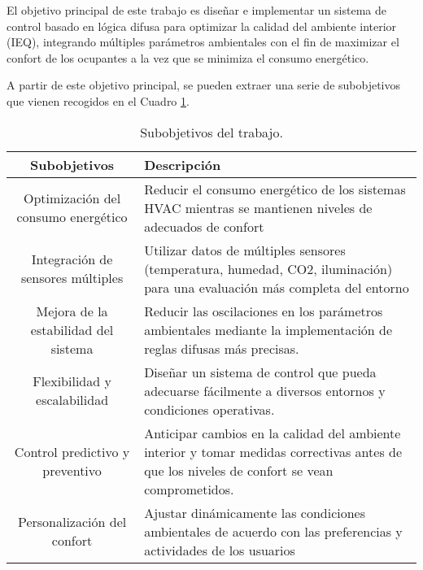 El objetivo principal de este trabajo es diseñar e implementar un sistema de control basado en lógica difusa para optimizar la calidad del ambiente interior (IEQ), integrando múltiples parámetros ambientales con el fin de maximizar el confort de los ocupantes a la vez que se minimiza el consumo energético.

A partir de este objetivo principal, se pueden extraer una serie de subobjetivos que vienen recogidos en el Cuadro \ref{tab:subobjetivos}.

\begin{table}[H]
	\centering
	\begin{tabular}{| c | p{9.6cm} |}
		\hline
		\rowcolor{lightgray}
		\textbf{Subobjetivos} & \textbf{Descripción} \\
		\hline
		Optimización del consumo energético & 
		Reducir el consumo energético de los sistemas HVAC mientras se mantienen niveles de adecuados de confort \vspace{0.2cm} \\
		\hline
		Integración de sensores múltiples & 
		Utilizar datos de múltiples sensores (temperatura, humedad, CO2, iluminación) para una evaluación más completa del entorno 
		\vspace{0.2cm} \\
		\hline
		Mejora de la estabilidad del sistema & 
		Reducir las oscilaciones en los parámetros ambientales mediante la implementación de reglas difusas más precisas.
		\vspace{0.2cm} \\
		\hline
		Flexibilidad y escalabilidad & 
		Diseñar un sistema de control que pueda adecuarse fácilmente a diversos entornos y condiciones operativas.
		\vspace{0.2cm} \\
		\hline
		Control predictivo y preventivo & 
		Anticipar cambios en la calidad del ambiente interior y tomar medidas correctivas antes de que los niveles de confort se vean comprometidos.
		\vspace{0.2cm} \\
		\hline
		Personalización del confort &
		Ajustar dinámicamente las condiciones ambientales de acuerdo con las preferencias y actividades de los usuarios
		\vspace{0.2cm} \\
		\hline
	\end{tabular}
	\caption{Subobjetivos del trabajo.}
	\label{tab:subobjetivos}
\end{table}